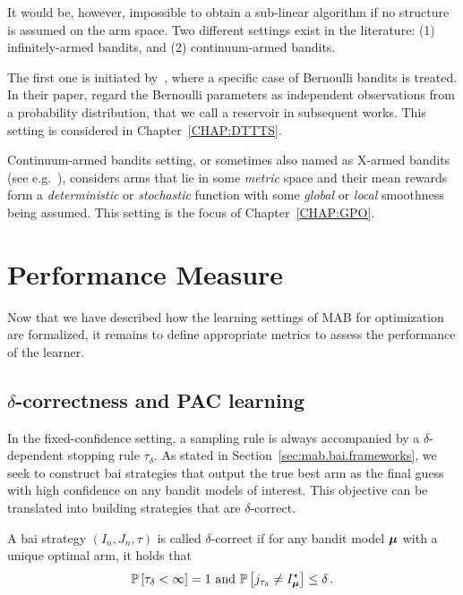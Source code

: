 It would be, however, impossible to obtain a sub-linear algorithm if no structure is assumed on the arm space. Two different settings exist in the literature: (1) \gls{infinitely-armed bandits}, and (2) \gls{continuum-armed bandits}. 

The first one is initiated by~\cite{berry1997infinite}, where a specific case of Bernoulli bandits is treated. In their paper, \cite{berry1997infinite} regard the Bernoulli parameters as independent observations from a probability distribution, that we call a \gls{reservoir} in subsequent works. This setting is considered in Chapter~\ref{CHAP:DTTTS}.

Continuum-armed bandits setting, or sometimes also named as \gls{X-armed bandits} (see e.g.~\citealt{bubeck2010x}), considers arms that lie in some \emph{metric} space and their mean rewards form a \emph{deterministic} or \emph{stochastic} function with some \emph{global} or \emph{local} smoothness being assumed. This setting is the focus of Chapter~\ref{CHAP:GPO}.

\section{Performance Measure}\label{sec:mab.performance}

Now that we have described how the learning settings of MAB for optimization are formalized, it remains to define appropriate metrics to assess the performance of the learner.

\subsection{$\delta$-correctness and PAC learning}\label{sec:mab.performance.pac}

In the fixed-confidence setting, a sampling rule is always accompanied by a $\delta$-dependent stopping rule $\tau_{\delta}$. As stated in Section~\ref{sec:mab.bai.frameworks}, we seek to construct \gls{bai} strategies that output the true best arm as the final guess with high confidence on any bandit models of interest. This objective can be translated into building strategies that are $\delta$-correct.

\begin{definition}\label{def:mab.delta}
\begin{leftbar}[defnbar]
A \gls{bai} strategy $(I_n,J_n,\tau)$ is called $\delta$-correct if for any bandit model ${\boldsymbol \mu}$ with a unique optimal arm, it holds that
\[
	\mathbb{P}\left[\tau_\delta < \infty\right] = 1 \text{ and } \mathbb{P}\left[j_{\tau_\delta}\neq I_{{\boldsymbol \mu}}^{\star}\right] \leq \delta\,.
\]
\end{leftbar}
\end{definition}

